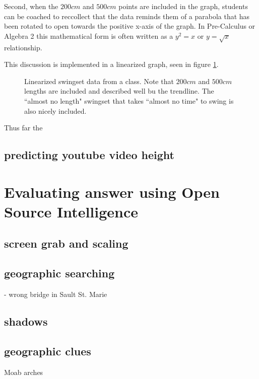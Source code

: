 \documentclass[12pt]{iopart}
\begin{document}
Second, when the $200cm$ and $500cm$ points are included in the graph, students can be coached to reccollect that the data reminds them of a parabola that has been rotated to open towards the positive x-axis of the graph.  In Pre-Calculus or Algebra 2 this mathematical form is often written as a $y^2=x$ or $y=\sqrt{x}$ relationship.  

This discussion is implemented in a linearized graph, seen in figure \ref{linearized_swingtime_graph}. 

\begin{figure}[h]
\centering
\caption{
	Linearized swingset data from a class.  Note that $200cm$ and $500cm$ lengths are included and described well bu the trendline.  The ``almost no length" swingset that takes ``almost no time" to swing is also nicely included.   
	}
	\label{linearized_swingtime_graph}
\end{figure}


Thus far the 

\subsection{predicting youtube video height}


\section{Evaluating answer using Open Source Intelligence}

\subsection{screen grab and scaling}

\subsection{geographic searching}
- wrong bridge in Sault St. Marie

\subsection{shadows}

\subsection{geographic clues}
Moab arches

\clearpage
\end{document}

